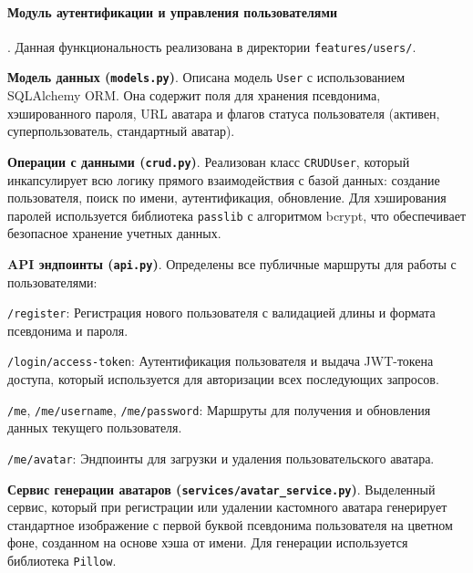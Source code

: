 \paragraph{Модуль аутентификации и управления пользователями}.
Данная функциональность реализована в директории \verb|features/users/|.
\begin{compactenum}
      \item \textbf{Модель данных (\texttt{models.py})}. Описана модель \verb|User| с
      использованием SQLAlchemy ORM. Она содержит поля для хранения псевдонима,
      хэшированного пароля, URL аватара и флагов статуса пользователя (активен,
      суперпользователь, стандартный аватар).
      \item \textbf{Операции с данными (\texttt{crud.py})}. Реализован класс \verb|CRUDUser|,
      который инкапсулирует всю логику прямого взаимодействия с базой данных:
      создание пользователя, поиск по имени, аутентификация, обновление. Для хэширования
      паролей используется библиотека \verb|passlib| с алгоритмом bcrypt, что обеспечивает
      безопасное хранение учетных данных.
      \item \textbf{API эндпоинты (\texttt{api.py})}. Определены все публичные маршруты для
      работы с пользователями:
      \begin{compactenum}
            \item \verb|/register|: Регистрация нового пользователя с валидацией длины и
            формата псевдонима и пароля.
            \item \verb|/login/access-token|: Аутентификация пользователя и
            выдача JWT-токена доступа, который используется для авторизации всех
            последующих запросов.
            \item \verb|/me|, \verb|/me/username|, \verb|/me/password|: Маршруты для получения и
            обновления данных текущего пользователя.
            \item \verb|/me/avatar|: Эндпоинты для загрузки и удаления пользовательского аватара.
      \end{compactenum}
      \item \textbf{Сервис генерации аватаров (\texttt{services/avatar\_service.py})}. Выделенный
      сервис, который при регистрации или удалении кастомного аватара генерирует стандартное
      изображение с первой буквой псевдонима пользователя на цветном фоне, созданном на
      основе хэша от имени. Для генерации используется библиотека \verb|Pillow|.
\end{compactenum}


